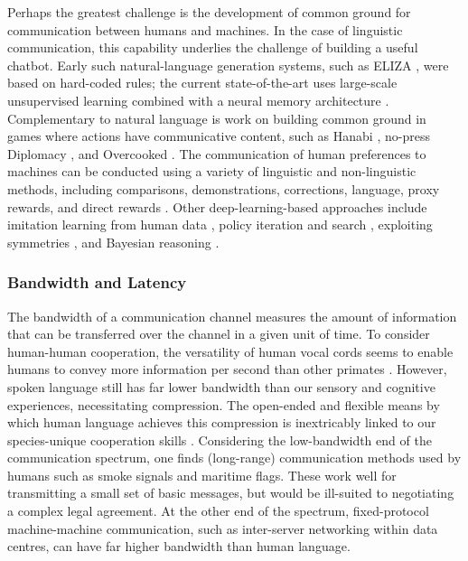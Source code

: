 \documentclass[11pt, a4paper, logo, onecolumn, nonumbering]{deepmind}
\begin{document}
Perhaps the greatest challenge is the development of common ground for communication between humans and machines. In the case of linguistic communication, this capability underlies the challenge of building a useful chatbot.  
Early such natural-language generation systems, such as ELIZA \cite{10.1145/357980.357991}, were based on hard-coded rules; the current state-of-the-art \cite{brown2020language} uses large-scale unsupervised learning combined with a neural memory architecture \cite{vaswani2017attention}.
Complementary to natural language is work on building common ground in games where actions have communicative content, such as Hanabi \cite{bard2020hanabi}, no-press Diplomacy \cite{kraus1995designing}, and Overcooked \cite{carroll2019utility}. %
The communication of human preferences to machines can be conducted using a variety of linguistic and non-linguistic methods, including comparisons, demonstrations, corrections, language, proxy rewards, and direct rewards \cite{jeon2020reward}.
Other deep-learning-based approaches include imitation learning from human data \cite{carroll2019utility, paquette2019press}, policy iteration and search \cite{anthony2020learning, lerer2019improving}, exploiting symmetries \cite{hu2020otherplay}, and Bayesian reasoning \cite{foerster2018bayesian}. 














\subsubsection{Bandwidth and Latency}

The bandwidth of a communication channel measures the amount of information that can be transferred over the channel in a given unit of time. To consider human-human cooperation, the versatility of human vocal cords seems to enable humans to convey more information per second than other primates \cite{ghazanfar2008evolution, fitch2018biology}. 
However, spoken language still has far lower bandwidth than our sensory and cognitive experiences, necessitating compression. The open-ended and flexible means by which human language achieves this compression is inextricably linked to our species-unique cooperation skills \cite{scott2014speaking}.  %
Considering the low-bandwidth end of the communication spectrum, one finds (long-range) communication methods used by humans such as smoke signals and maritime flags. These work well for transmitting a small set of basic messages, but would be ill-suited to negotiating a complex legal agreement. At the other end of the spectrum, fixed-protocol machine-machine communication, such as inter-server networking within data centres, can have far higher bandwidth than human language.
\end{document}
